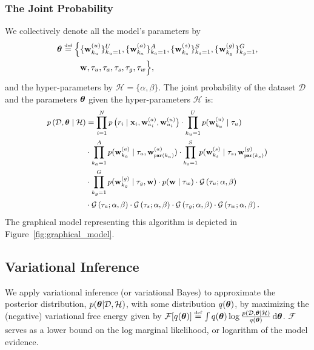 \subsubsection{The Joint Probability}
We collectively denote all the model's parameters by 
\begin{align*}
	\btheta \defined \Big\{
	& \{ \w_{k_u}^{(u)} \}_{k_u=1}^U, \{ \w_{k_a}^{(a)} \}_{k_a=1}^A, \{ \w_{k_s}^{(s)} \}_{k_s=1}^S, \{ \w_{k_g}^{(g)} \}_{k_g=1}^G,\\
	& \w, \tau_u, \tau_a, \tau_s, \tau_g, \tau_w \Big\},
	\label{eq:paramters}
\end{align*} 
and the hyper-parameters by $\mathcal{H}= \{ \alpha , \beta \} $.
The joint probability of the dataset $\mathcal{D}$ and the parameters $\bm{\theta}$ given the hyper-parameters $\mathcal{H}$ is: 
\begin{equation}
\begingroup\makeatletter\def\f@size{\fsize}\check@mathfonts
\def\maketag@@@#1{\hbox{\m@th\large\normalfont#1}}%
\begin{aligned}
p\left(\mathcal{D}, \btheta \mid \mathcal{H} \right)& = \prod_{i=1}^N p\left( r_i \mid \x_i , \w^{(a)}_{a_i}, \w^{(u)}_{u_i} \right) \cdot \prod_{k_u=1}^Up(\w^{(u)}_{k_u} \mid \tau_u ) \\
& \cdot \prod_{k_a=1}^Ap(\w^{(a)}_{k_a} \mid \tau_a, \w^{(a)}_{\parent(k_a)} ) 
\cdot \prod_{k_s=1}^S p(\w^{(s)}_{k_s} \mid \tau_s, \w^{(g)}_{\parent(k_s)} ) \\
& \cdot \prod_{k_g=1}^G p(\w^{(g)}_{k_g} \mid \tau_g, \w) \cdot p(\w \mid \tau_w ) \cdot \mathcal{G} \left(\tau_u ; \alpha, \beta \right)  \\
& \cdot \mathcal{G}\left(\tau_a ; \alpha, \beta \right) 
\cdot \mathcal{G}\left(\tau_s ; \alpha, \beta \right) 
\cdot \mathcal{G}\left(\tau_g ; \alpha, \beta \right)
\cdot \mathcal{G}\left(\tau_w ; \alpha, \beta \right).
\label{eq:joint-likelihood}
\end{aligned}\endgroup
\end{equation} 
The graphical model representing this algorithm is depicted in Figure~\ref{fig:graphical_model}.



\subsection{Variational Inference}
We apply variational inference (or variational Bayes) to approximate the posterior distribution,
$p(\bm{\theta} | \mathcal{D}, \mathcal{H} )$,  with some distribution $q(\bm{\theta})$,
by maximizing the (negative) variational free energy given by
$
\mathcal{F} [ q(\btheta) ] \defined \int q(\btheta) \log \frac{p(\mathcal{D}, \btheta | \mathcal{H})}{q(\btheta)} \, \mathrm{d} \btheta
$.
$\mathcal{F}$ serves as a lower bound on the log marginal likelihood, or logarithm of the model evidence. 

